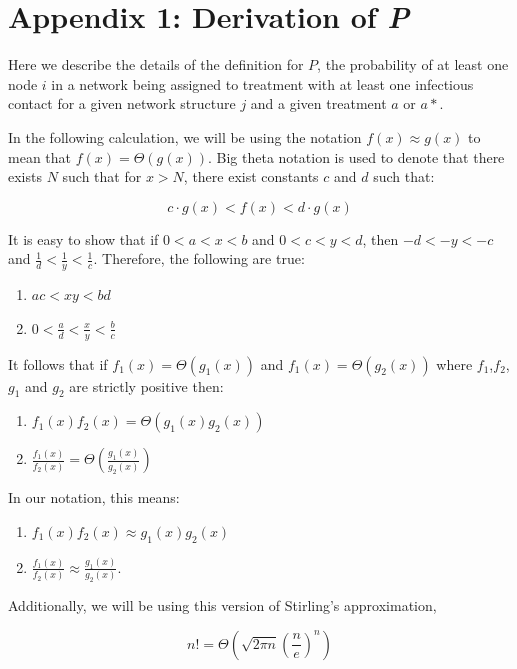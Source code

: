 \documentclass{article}
\theoremstyle{definition}
\begin{document}
\newpage



\newpage


\appendix
{}
\section{Appendix 1: Derivation of  \textit{P}}
\label{Appendix 1}
Here we describe the details of the definition for $P$, the probability of at least one node $i$ in a network being assigned to treatment with at least one infectious contact for a given network structure $j$ and a given treatment $a$ or $a*$.

In the following calculation, we will be using the notation $f(x)\approx g(x)$ to mean that $f(x)=\Theta(g(x))$. Big theta notation is used to denote that there exists $N$ such that for $x>N$, there exist constants $c$ and $d$ such that:
 
 $$c\cdot g(x)< f(x) < d \cdot g(x) $$

It is easy to show that if $0<a<x<b$ and $0<c<y<d$, then $-d<-y<-c$ and $\frac{1}{d}<\frac{1}{y}<\frac{1}{c}$.  Therefore, the following are true:
\begin{enumerate}
\item $ac<xy<bd$
\item $0<\frac{a}{d}<\frac{x}{y}<\frac{b}{c}$
\end{enumerate}

It follows that if $f_1(x)=\Theta{\left(g_1(x)\right)}$ and $f_1(x)=\Theta{\left(g_2(x)\right)}$ where $f_1$,$f_2$, $g_1$ and $g_2$ are strictly positive then:
\begin{enumerate}
\item $f_1(x)f_2(x)=\Theta{\left(g_1(x)g_2(x)\right)}$
\item $\frac{f_1(x)}{f_2(x)}=\Theta{\left(\frac{g_1(x)}{g_2(x)}\right)}$
\end{enumerate}

In our notation, this means:
\begin{enumerate}
     \item $f_1(x)f_2(x)\approx g_1(x)g_2(x)$ 
     \item $\frac{f_1(x)}{f_2(x)}\approx \frac{g_1(x)}{g_2(x)}$.
\end{enumerate}


Additionally, we will be using this version of Stirling's approximation,

$$n!= \Theta\left(\sqrt{2\pi n}\left(\frac{n}{e}\right)^n \right)$$
\end{document}
